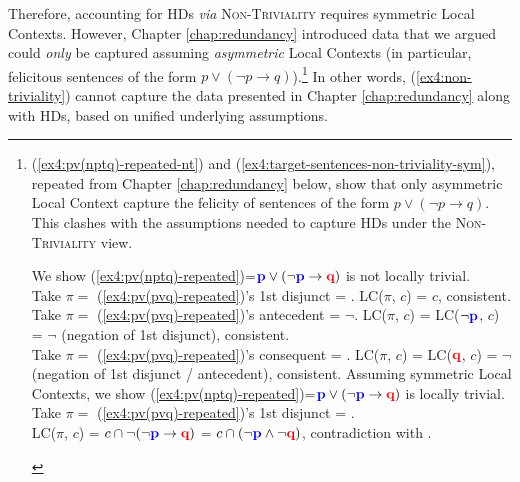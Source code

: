 \begin{exe}
	\label{ex5:hurford-non-triviality-asym}
\end{exe}

Therefore, accounting for HDs \textit{via} \textsc{Non-Triviality} requires symmetric Local Contexts. However, Chapter \ref{chap:redundancy} introduced data that we argued could \textit{only} be captured assuming \textit{asymmetric} Local Contexts (in particular, felicitous sentences of the form $p \vee (\neg p \rightarrow q)$).\footnote{(\ref{ex4:pv(nptq)-repeated-nt}) and (\ref{ex4:target-sentences-non-triviality-sym}), repeated from Chapter \ref{chap:redundancy} below, show that only asymmetric Local Context capture the felicity of sentences of the form $p \vee (\neg p \rightarrow q)$. This clashes with the assumptions needed to capture HDs under the \textsc{Non-Triviality} view.
\begin{exe}
	 {\noindent We show  (\ref{ex4:pv(nptq)-repeated})=$\textbf{\textcolor{blue}{p}} \vee (\neg \textbf{\textcolor{blue}{p}} \rightarrow \textbf{\textcolor{red}{q}})$ is not locally trivial.\\
		Take $\pi =$ (\ref{ex4:pv(pvq)-repeated})'s 1st disjunct  = \p. LC($\pi$, $c$) = $c$, consistent.\\
		Take $\pi =$ (\ref{ex4:pv(pvq)-repeated})'s antecedent  = $\neg$\p. LC($\pi$, $c$) = LC($\neg \textbf{\textcolor{blue}{p}}$, $c$) = $\neg$\p{} (negation of 1st disjunct), consistent. \\
		Take $\pi =$ (\ref{ex4:pv(pvq)-repeated})'s consequent  = \q. LC($\pi$, $c$) = LC($\textbf{\textcolor{red}{q}}$, $c$) = $\neg$\p{} (negation of 1st disjunct / antecedent), consistent. 
	}
	 {Assuming symmetric Local Contexts, we show (\ref{ex4:pv(nptq)-repeated})=$\textbf{\textcolor{blue}{p}} \vee (\neg \textbf{\textcolor{blue}{p}} \rightarrow \textbf{\textcolor{red}{q}})$ is locally trivial.\\
		Take $\pi =$ (\ref{ex4:pv(pvq)-repeated})'s 1st disjunct  = \p.\\
		LC($\pi$, $c$) = $c\cap\neg(\neg\textbf{\textcolor{blue}{p}}\rightarrow\textbf{\textcolor{red}{q}})$ = $c\cap(\neg\textbf{\textcolor{blue}{p}}\wedge\neg\textbf{\textcolor{red}{q}})$, contradiction with \p.
	}
\end{exe}
} In other words, (\ref{ex4:non-triviality}) cannot capture the data presented in Chapter \ref{chap:redundancy} along with HDs, based on unified underlying assumptions.\\

